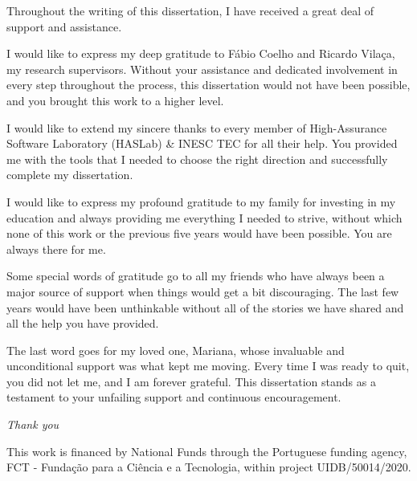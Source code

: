 Throughout the writing of this dissertation, I have received a great deal of support and assistance.

I would like to express my deep gratitude to Fábio Coelho and Ricardo Vilaça, my research supervisors. Without your assistance and dedicated involvement in every step throughout the process, this dissertation would not have been possible, and you brought this work to a higher level.

I would like to extend my sincere thanks to every member of High-Assurance Software Laboratory (HASLab) \& INESC TEC for all their help. You provided me with the tools that I needed to choose the right direction and successfully complete my dissertation.

I would like to express my profound gratitude to my family for investing in my education and always providing me everything I needed to strive, without which none of this work or the previous five years would have been possible. You are always there for me.

Some special words of gratitude go to all my friends who have always been a major
source of support when things would get a bit discouraging. The last few years would have been unthinkable without all of the stories we have shared and all the help you have provided.

The last word goes for my loved one, Mariana, whose invaluable and unconditional support was what kept me moving. Every time I was ready to quit, you did not let me, and I am forever grateful. This dissertation stands as a testament to your unfailing support and continuous encouragement.

\bigbreak
\hfill \textit{Thank you}
\bigbreak


This work is financed by National Funds through the Portuguese funding agency, FCT - Fundação
para a Ciência e a Tecnologia, within project UIDB/50014/2020.